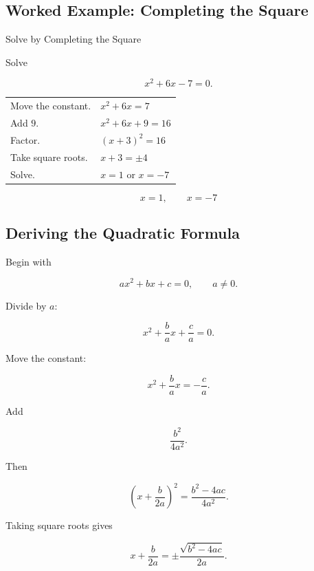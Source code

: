 \subsection{Worked Example: Completing the Square}
\label{subsec:worked-completing-square}

\begin{workedexamplebox}{Solve by Completing the Square}

Solve

\[ x^2+6x-7=0. \]

\begin{tabularx}{\textwidth}{@{}>{\raggedright\arraybackslash}p{}X@{}}
Move the constant. & \(x^2+6x=7\)\\
Add \(9\). & \(x^2+6x+9=16\)\\
Factor. & \((x+3)^2=16\)\\
Take square roots. & \(x+3=\pm4\)\\
Solve. & \(x=1\) or \(x=-7\)
\end{tabularx}

\begin{answerbox}
\[ x=1,\qquad x=-7 \]
\end{answerbox}
\end{workedexamplebox}

\subsection{Deriving the Quadratic Formula}
\label{subsec:deriving-quadratic-formula}

Begin with

\[ ax^2+bx+c=0,\qquad a\neq0. \]

Divide by \(a\):

\[ x^2+\frac ba x+\frac ca=0. \]

Move the constant:

\[ x^2+\frac ba x=-\frac ca. \]

Add

\[ \frac{b^2}{4a^2}. \]

Then

\[ \left(x+\frac{b}{2a}\right)^2=\frac{b^2-4ac}{4a^2}. \]

Taking square roots gives

\[ x+\frac{b}{2a}=\pm\frac{\sqrt{b^2-4ac}}{2a}. \]

